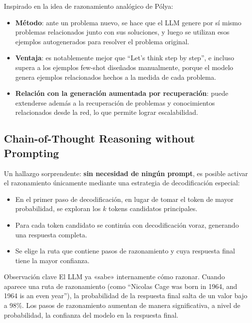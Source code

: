 \documentclass[a4paper]{article}
\begin{document}
Inspirado en la idea de razonamiento analógico de P\'{o}lya:

\begin{itemize}
    \item \textbf{Método}: ante un problema nuevo, se hace que el LLM genere por sí mismo problemas relacionados junto con sus soluciones, y luego se utilizan esos ejemplos autogenerados para resolver el problema original.
    \item \textbf{Ventaja}: es notablemente mejor que ``Let's think step by step'', e incluso supera a los ejemplos few-shot diseñados manualmente, porque el modelo genera ejemplos relacionados hechos a la medida de cada problema.
    \item \textbf{Relación con la generación aumentada por recuperación}: puede extenderse además a la recuperación de problemas y conocimientos relacionados desde la red, lo que permite lograr escalabilidad.
\end{itemize}

\subsection{Chain-of-Thought Reasoning without Prompting}

Un hallazgo sorprendente: \textbf{sin necesidad de ningún prompt}, es posible activar el razonamiento únicamente mediante una estrategia de decodificación especial:

\begin{itemize}
    \item En el primer paso de decodificación, en lugar de tomar el token de mayor probabilidad, se exploran los $k$ tokens candidatos principales.
    \item Para cada token candidato se continúa con decodificación voraz, generando una respuesta completa.
    \item Se elige la ruta que contiene pasos de razonamiento y cuya respuesta final tiene la mayor confianza.
\end{itemize}

\begin{importantbox}{Observación clave}
El LLM ya «sabe» internamente cómo razonar. Cuando aparece una ruta de razonamiento (como ``Nicolas Cage was born in 1964, and 1964 is an even year''), la probabilidad de la respuesta final salta de un valor bajo a 98\%. Los pasos de razonamiento aumentan de manera significativa, a nivel de probabilidad, la confianza del modelo en la respuesta final.
\end{importantbox}
\end{document}

